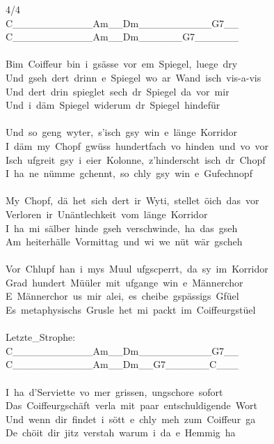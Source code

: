 \documentclass[]{book}
\begin{document}
4/4\\
\textbar C\_\_\_\_\_\_\_\textbar\_\_\_\_Am\_\_\textbar Dm\_\_\_\_\_\_\textbar\_\_\_\_G7\_\_\textbar{}\\
\textbar C\_\_\_\_\_\_\_\textbar\_\_\_\_Am\_\_\textbar Dm\_\_\_\_\_\_\textbar G7\_\_\_\_\_\_\textbar{}\\
~\\
Bim~Coiffeur~bin~i~gsässe~vor~em~Spiegel,~luege~dry\\
Und~gseh~dert~drinn~e~Spiegel~wo~ar~Wand~isch~vis-a-vis\\
Und~dert~drin~spieglet~sech~dr~Spiegel~da~vor~mir\\
Und~i~däm~Spiegel~widerum~dr~Spiegel~hindefür\\
~\\
Und~so~geng~wyter,~s'isch~gsy~win~e~länge~Korridor\\
I~däm~my~Chopf~gwüss~hundertfach~vo~hinden~und~vo~vor\\
Isch~ufgreit~gsy~i~eier~Kolonne,~z'hinderscht~isch~dr~Chopf\\
I~ha~ne~nümme~gchennt,~so~chly~gsy~win~e~Gufechnopf\\
~\\
My~Chopf,~dä~het~sich~dert~ir~Wyti,~stellet~öich~das~vor\\
Verloren~ir~Unäntlechkeit~vom~länge~Korridor\\
I~ha~mi~sälber~hinde~gseh~verschwinde,~ha~das~gseh\\
Am~heiterhälle~Vormittag~und~wi~we~nüt~wär~gscheh\\
~\\
Vor~Chlupf~han~i~mys~Muul~ufgscperrt,~da~sy~im~Korridor\\
Grad~hundert~Müüler~mit~ufgange~win~e~Männerchor\\
E~Männerchor~us~mir~alei,~es~cheibe~gspässigs~Gfüel\\
Es~metaphysischs~Grusle~het~mi~packt~im~Coiffeurgstüel\\
~\\
Letzte\_Strophe:\\
\textbar C\_\_\_\_\_\_\_\textbar\_\_\_\_Am\_\_\textbar Dm\_\_\_\_\_\_\textbar\_\_\_\_G7\_\_\textbar{}\\
\textbar C\_\_\_\_\_\_\_\textbar\_\_\_\_Am\_\_\textbar Dm\_\_G7\_\_\textbar\_\_\_\_C\_\_\_\textbar~\\
~\\
I~ha~d'Serviette~vo~mer~grissen,~ungschore~sofort\\
Das~Coiffeurgschäft~verla~mit~paar~entschuldigende~Wort\\
Und~wenn~dir~findet~i~sött~e~chly~meh~zum~Coiffeur~ga\\
De~chöit~dir~jitz~verstah~warum~i~da~e~Hemmig~ha\\
~\\
~\\
~\\
\end{document}
